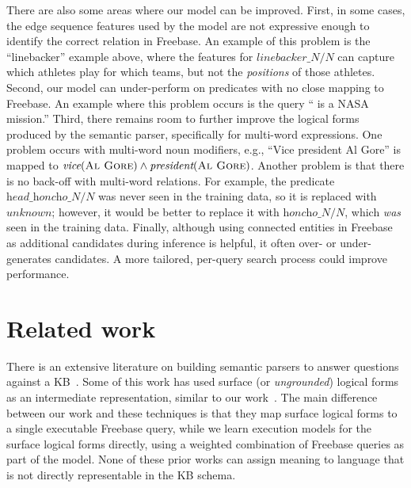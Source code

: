 \documentclass[11pt,letterpaper]{article}
\newcommand{\blank}{\underline{\hspace{.5cm}}}
\newcommand{\lexicalpredicate}[1]{\ensuremath{\textit{#1}}}
\newcommand{\entity}[1]{\ensuremath{\textsc{#1}}}
\begin{document}
There are also some areas where our model can be improved. First, in some cases, the edge sequence
features used by the model are not expressive enough to identify the correct relation in Freebase.
An example of this problem is the ``linebacker'' example above, where the features for
\lexicalpredicate{linebacker\_N/N} can capture which athletes play for which teams, but not the
\emph{positions} of those athletes. Second, our model can under-perform on predicates with no close
mapping to Freebase. An example where this problem occurs is the query ``\blank{} is a NASA
mission.'' Third, there remains room to further improve the logical forms produced by the semantic
parser, specifically for multi-word expressions. One problem occurs with multi-word noun modifiers,
e.g., ``Vice president Al Gore'' is mapped to $\lexicalpredicate{vice}(\entity{Al Gore}) \land
\lexicalpredicate{president}(\entity{Al Gore})$. Another problem is that there is no back-off with
multi-word relations. For example, the predicate \lexicalpredicate{head\_honcho\_N/N} was never
seen in the training data, so it is replaced with \lexicalpredicate{unknown}; however, it would be
better to replace it with \lexicalpredicate{honcho\_N/N}, which \emph{was} seen in the training
data. Finally, although using connected entities in Freebase as additional candidates during
inference is helpful, it often over- or under-generates candidates. A more tailored, per-query
search process could improve performance.

\section{Related work}

There is an extensive literature on building semantic parsers to answer questions against a
KB~\cite{zettlemoyer-2005-ccg,berant-2013-semantic-parsing-qa,%
krishnamurthy-2012-semantic-parsing,li-2015-semantic-parsing-scfg}.  Some of this work has used
surface (or \emph{ungrounded}) logical forms as an intermediate representation, similar to our
work~\cite{kwiatkowski-2013-ontology-matching,reddy-2014-graph-matching,%
yih-2015-semparse-query-graph,reddy-2016-dep-lambda}.  The main difference between our work and
these techniques is that they map surface logical forms to a single executable Freebase query,
while we learn execution models for the surface logical forms directly, using a weighted
combination of Freebase queries as part of the model.  None of these prior works can assign meaning
to language that is not directly representable in the KB schema.
\end{document}
